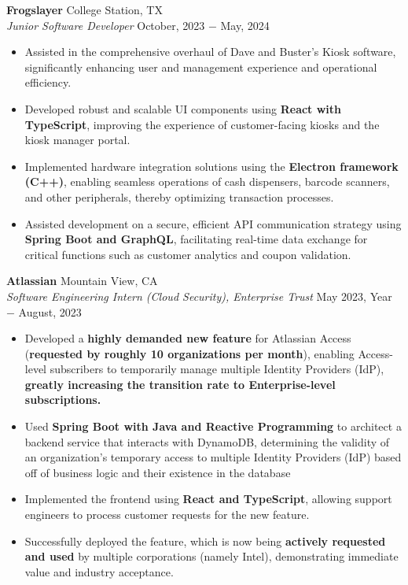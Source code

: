 \documentclass{article}
\begin{document}
\noindent \textbf{Frogslayer} \hfill College Station, TX \\
\textit{Junior Software Developer} \hfill October, 2023 $-$ May, 2024
\begin{itemize}[noitemsep,nolistsep,leftmargin=*]
\item {Assisted in the comprehensive overhaul of Dave and Buster's Kiosk software, significantly enhancing user and management experience and operational efficiency.}
\item {Developed robust and scalable UI components using \textbf{React with TypeScript}, improving the experience of customer-facing kiosks and the kiosk manager portal.}
\item {Implemented hardware integration solutions using the \textbf{Electron framework (C++)}, enabling seamless operations of cash dispensers, barcode scanners, and other peripherals, thereby optimizing transaction processes.}
\item {Assisted development on a secure, efficient API communication strategy using \textbf{Spring Boot and GraphQL}, facilitating real-time data exchange for critical functions such as customer analytics and coupon validation.} \\
\end{itemize}

\noindent \textbf{Atlassian} \hfill Mountain View, CA \\
\textit{Software Engineering Intern (Cloud Security), Enterprise Trust} \hfill May 2023, Year $-$ August, 2023
\begin{itemize}[noitemsep,nolistsep,leftmargin=*]
\item {Developed a \textbf{highly demanded new feature} for Atlassian Access (\textbf{requested by roughly 10 organizations per month}), enabling Access-level subscribers to temporarily manage multiple Identity Providers (IdP), \textbf{greatly increasing the transition rate to Enterprise-level subscriptions.}}
\item{Used \textbf{Spring Boot with Java and Reactive Programming} to architect a backend service that interacts with DynamoDB, determining the validity of an organization's temporary access to multiple Identity Providers (IdP) based off of business logic and their existence in the database}
\item {Implemented the frontend using \textbf{React and TypeScript}, allowing support engineers to process customer requests for the new feature. }
\item {Successfully deployed the feature, which is now being \textbf{actively requested and used} by multiple corporations (namely Intel), demonstrating immediate value and industry acceptance. \\}
\end{itemize}
\end{document}
